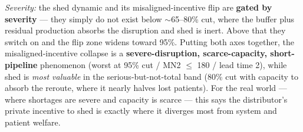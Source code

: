 \documentclass[11pt]{article}
\begin{document}
\emph{Severity:} the shed dynamic and its misaligned-incentive flip are \textbf{gated by
severity} --- they simply do not exist below $\sim$65--80\% cut, where the buffer plus residual
production absorbs the disruption and shed is inert. Above that they switch on and the flip zone
widens toward 95\%. Putting both axes together, the misaligned-incentive collapse is a
\textbf{severe-disruption, scarce-capacity, short-pipeline} phenomenon (worst at 95\% cut /
MN2 $\le$ 180 / lead time 2), while shed is \emph{most valuable} in the serious-but-not-total
band (80\% cut with capacity to absorb the reroute, where it nearly halves lost patients). For
the real world --- where shortages are severe and capacity is scarce --- this says the
distributor's private incentive to shed is exactly where it diverges most from system and patient
welfare.
\end{document}
